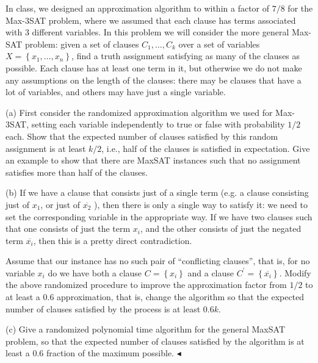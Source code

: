 \documentclass[11pt]{article}
\newenvironment{problem}[2][Problem]{\begin{trivlist}
    \item[\hskip \labelsep{\bfseries#1}\hskip\labelsep{\bfseries#2.}]\mbox{}\newline}{\hfill$\blacktriangleleft$\end{trivlist}}
\begin{document}
\begin{problem}{2.(MaxSAT)}
In class, we designed an approximation algorithm to within a factor of $7 / 8$ for the Max-3SAT problem, where we assumed that each clause has terms associated with 3 different variables. In this problem we will consider the more general Max-SAT problem: given a set of clauses $C_{1}, \ldots, C_{k}$ over a set of variables $X=\left\{x_{1}, \ldots, x_{n}\right\}$, find a truth assignment satisfying as many of the clauses as possible. Each clause has at least one term in it, but otherwise we do not make any assumptions on the length of the clauses: there may be clauses that have a lot of variables, and others may have just a single variable.

(a) First consider the randomized approximation algorithm we used for Max-3SAT, setting each variable independently to true or false with probability $1 / 2$ each. Show that the expected number of clauses satisfied by this random assignment is at least $k / 2$, i.e., half of the clauses is satisfied in expectation. Give an example to show that there are MaxSAT instances such that no assignment satisfies more than half of the clauses.

(b) If we have a clause that consists just of a single term (e.g. a clause consisting just of $x_{1}$, or just of $\overline{x_{2}}$ ), then there is only a single way to satisfy it: we need to set the corresponding variable in the appropriate way. If we have two clauses such that one consists of just the term $x_{i}$, and the other consists of just the negated term $\overline{x_{i}}$, then this is a pretty direct contradiction.

Assume that our instance has no such pair of ``conflicting clauses'', that is, for no variable $x_{i}$ do we have both a clause $C=\left\{x_{i}\right\}$ and a clause $C^{\prime}=\left\{\overline{x_{i}}\right\}$. Modify the above randomized procedure to improve the approximation factor from $1 / 2$ to at least a $0.6$ approximation, that is, change the algorithm so that the expected number of clauses satisfied by the process is at least $0.6k$.

(c) Give a randomized polynomial time algorithm for the general MaxSAT problem, so that the expected number of clauses satisfied by the algorithm is at least a $0.6$ fraction of the maximum possible.
\end{problem}
\end{document}

